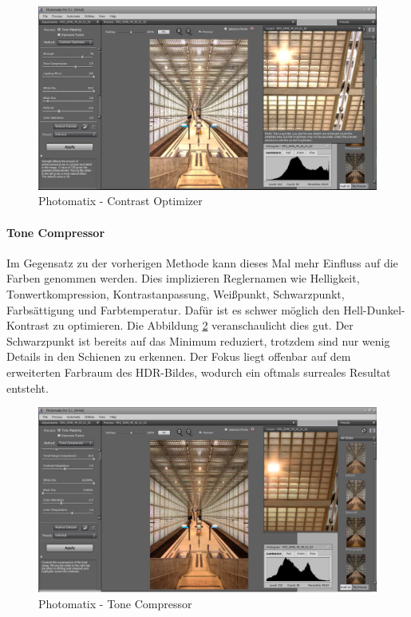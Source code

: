 \documentclass[liststotoc,bibtotoc,fontsize=14pt,]{scrreprt}
\begin{document}
		\bigskip
		\begin{figure}[H]
			\includegraphics[width=\linewidth]{img/photo4.jpg}
			\caption{Photomatix - Contrast Optimizer}
			\label{img:photo4}
		\end{figure}
		
		\paragraph{Tone Compressor} Im Gegensatz zu der vorherigen Methode kann dieses Mal mehr Einfluss auf die Farben genommen werden. Dies implizieren Reglernamen wie Helligkeit, Tonwertkompression, Kontrastanpassung, Weißpunkt, Schwarzpunkt, Farbsättigung und Farbtemperatur. Dafür ist es schwer möglich den Hell-Dunkel-Kontrast zu optimieren. Die Abbildung \ref{img:photo5} veranschaulicht dies gut. Der Schwarzpunkt ist bereits auf das Minimum reduziert, trotzdem sind nur wenig Details in den Schienen zu erkennen. Der Fokus liegt offenbar auf dem erweiterten Farbraum des HDR-Bildes, wodurch ein oftmals surreales Resultat entsteht.
		
		\bigskip
		\begin{figure}[H]
			\includegraphics[width=\linewidth]{img/photo5.jpg}
			\caption{Photomatix - Tone Compressor}
			\label{img:photo5}
		\end{figure}
	
\end{document}
